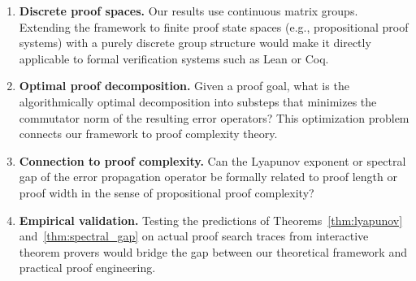 \begin{enumerate}[leftmargin=*,itemsep=2pt]
\item \textbf{Discrete proof spaces.}
  Our results use continuous matrix groups.  Extending the framework
  to finite proof state spaces (e.g., propositional proof systems)
  with a purely discrete group structure would make it directly
  applicable to formal verification systems such as Lean or Coq.

\item \textbf{Optimal proof decomposition.}
  Given a proof goal, what is the algorithmically optimal decomposition
  into substeps that minimizes the commutator norm of the resulting
  error operators?  This optimization problem connects our framework
  to proof complexity theory.

\item \textbf{Connection to proof complexity.}
  Can the Lyapunov exponent or spectral gap of the error propagation
  operator be formally related to proof length or proof width in the
  sense of propositional proof complexity?

\item \textbf{Empirical validation.}
  Testing the predictions of Theorems~\ref{thm:lyapunov}
  and~\ref{thm:spectral_gap} on actual proof search traces from
  interactive theorem provers would bridge the gap between our
  theoretical framework and practical proof engineering.
\end{enumerate}
